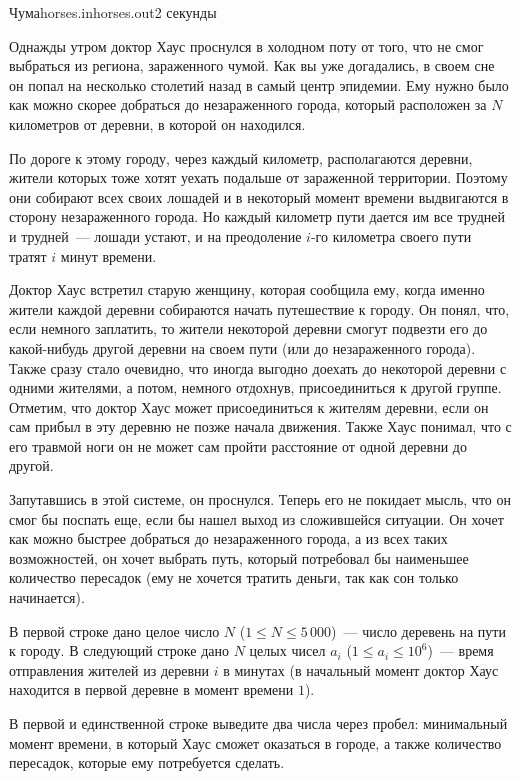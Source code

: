 \begin{problem}{Чума}{horses.in}{horses.out}{2 секунды}


Однажды утром доктор Хаус проснулся в холодном поту от того, что не смог выбраться из региона, зараженного чумой. Как вы уже догадались, в своем сне 
он попал на несколько столетий назад в самый центр эпидемии. Ему нужно было как можно скорее добраться до незараженного города, который расположен за 
$N$ километров от деревни, в которой он находился.

По дороге к этому городу, через каждый километр, располагаются деревни, жители которых тоже хотят 
уехать подальше от зараженной территории. Поэтому они собирают всех своих лошадей и в некоторый момент времени выдвигаются в сторону незараженного 
города. Но каждый километр пути дается им все трудней и трудней~--- лошади устают, и на преодоление $i$-го километра своего пути тратят $i$ минут 
времени. 

Доктор Хаус встретил старую женщину, которая сообщила ему, когда именно жители каждой деревни собираются начать путешествие к городу. Он понял, что, 
если немного заплатить, то жители некоторой деревни смогут подвезти его до какой-нибудь другой деревни на своем пути (или до незараженного города). 
Также сразу стало очевидно, что иногда выгодно доехать до некоторой деревни с одними жителями, а потом, немного отдохнув, присоединиться к другой 
группе. Отметим, что доктор Хаус может присоединиться к жителям деревни, если он сам прибыл в эту деревню не позже начала движения. Также Хаус 
понимал, что с его травмой ноги он не может сам пройти расстояние от одной деревни до другой. 

Запутавшись в этой системе, он проснулся. Теперь его не покидает мысль, что он смог бы поспать еще, если бы нашел выход из сложившейся ситуации. Он 
хочет как можно быстрее добраться до незараженного города, а из всех таких возможностей, он хочет выбрать путь, который потребовал бы наименьшее 
количество пересадок (ему не хочется тратить деньги, так как сон только начинается).  

\InputFile
В первой строке дано целое число $N$ ($1 \le N \le 5{\,}000$)~--- число деревень на пути к городу. В следующий строке дано $N$ целых чисел $a_i$ 
($1 \le a_i \le 10^6$)~--- время отправления жителей из деревни $i$ в минутах (в начальный момент доктор Хаус находится в первой деревне в момент 
времени $1$).

\OutputFile               
В первой и единственной строке выведите два числа через пробел: минимальный момент времени, в который Хаус сможет оказаться в городе, а также 
количество пересадок, которые ему потребуется сделать. 

\Examples
\begin{example}%
%
%
\end{example}

\end{problem}

